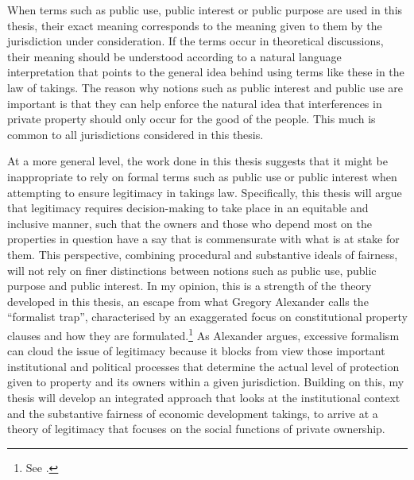 {When terms such as public use, public interest or public purpose are used in this thesis, their exact meaning corresponds to the meaning given to them by the jurisdiction under consideration. If the terms occur in theoretical discussions, their meaning should be understood according to a natural language interpretation that points to the general idea behind using terms like these in the law of takings. The reason why notions such as public interest and public use are important is that they can help enforce the natural idea that interferences in private property should only occur for the good of the people. This much is common to all jurisdictions considered in this thesis. %

At a more general level, the work done in this thesis suggests that it might be inappropriate to rely on formal terms such as public use or public interest when attempting to ensure legitimacy in takings law. Specifically, this thesis will argue that legitimacy requires decision-making to take place in an equitable and inclusive manner, such that the owners and those who depend most on the properties in question have a say that is commensurate with what is at stake for them. This perspective, combining procedural and substantive ideals of fairness, will not rely on finer distinctions between notions such as public use, public purpose and public interest. In my opinion, this is a strength of the theory developed in this thesis, an escape from what Gregory Alexander calls the ``formalist trap'', characterised by an exaggerated focus on constitutional property clauses and how they are formulated.\footnote{See \cite[Chapter 1]{alexander06}.} As Alexander argues, excessive formalism can cloud the issue of legitimacy because it blocks from view those important institutional and political processes that determine the actual level of protection given to property and its owners within a given jurisdiction. Building on this, my thesis will develop an integrated approach that looks at the institutional context and the substantive fairness of economic development takings, to arrive at a theory of legitimacy that focuses on the social functions of private ownership.



}
